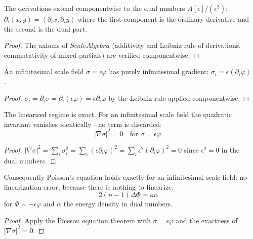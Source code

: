 \begin{theorem}
The derivations extend componentwise to the dual numbers $A[\epsilon]/(\epsilon^2)$: $\partial_i(x, y) = (\partial_i x, \partial_i y)$ where the first component is the ordinary derivative and the second is the dual part. 
\end{theorem}

\begin{proof}
The axioms of $ScaleAlgebra$ (additivity and Leibniz rule of derivations, commutativity of mixed partials) are verified componentwise.
\end{proof}

\begin{theorem}
An infinitesimal scale field $\sigma = \epsilon\varphi$ has purely infinitesimal gradient: $\sigma_i = \epsilon(\partial_i\varphi)$. 
\end{theorem}

\begin{proof}
$\sigma_i = \partial_i \sigma = \partial_i(\epsilon\varphi) = \epsilon\partial_i\varphi$ by the Leibniz rule applied componentwise.
\end{proof}

\begin{theorem}
The linearised regime is exact. For an infinitesimal scale field the quadratic invariant vanishes identically---no term is discarded:
$$|\nabla\sigma|^2 = 0 \quad \text{for } \sigma = \epsilon\varphi.$$
\end{theorem}

\begin{proof}
$|\nabla\sigma|^2 = \sum_i \sigma_i^2 = \sum_i (\epsilon\partial_i\varphi)^2 = \sum_i \epsilon^2(\partial_i\varphi)^2 = 0$ since $\epsilon^2 = 0$ in the dual numbers.
\end{proof}

\begin{theorem}
Consequently Poisson's equation holds exactly for an infinitesimal scale field: no linearization error, because there is nothing to linearize.
$$2(n-1)\Delta\Phi = \kappa\alpha$$
for $\Phi = -\epsilon\varphi$ and $\alpha$ the energy density in dual numbers. 
\end{theorem}

\begin{proof}
Apply the Poisson equation theorem with $\sigma = \epsilon\varphi$ and the exactness of $|\nabla\sigma|^2 = 0$.
\end{proof}

